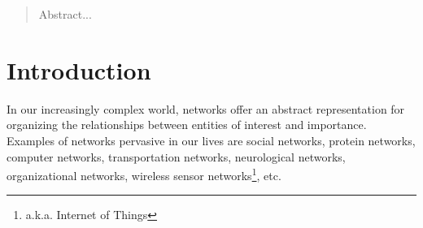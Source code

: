 \documentclass{sig-alternate}
\begin{document}
{%
}

\maketitle

\begin{abstract}
Abstract...
\end{abstract}



\section{Introduction}


In our increasingly complex world, networks offer an abstract representation for organizing the relationships between entities of interest and importance. Examples of networks pervasive in our lives are social networks, protein networks, computer networks, transportation networks, neurological networks, organizational networks, wireless sensor networks\footnote{a.k.a. Internet of Things}, etc.
\end{document}
